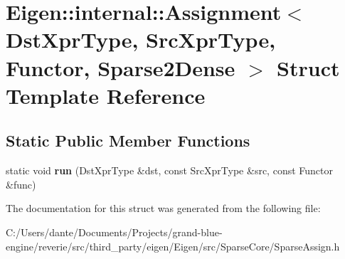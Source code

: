 \hypertarget{struct_eigen_1_1internal_1_1_assignment_3_01_dst_xpr_type_00_01_src_xpr_type_00_01_functor_00_01_sparse2_dense_01_4}{}\section{Eigen\+::internal\+::Assignment$<$ Dst\+Xpr\+Type, Src\+Xpr\+Type, Functor, Sparse2\+Dense $>$ Struct Template Reference}
\label{struct_eigen_1_1internal_1_1_assignment_3_01_dst_xpr_type_00_01_src_xpr_type_00_01_functor_00_01_sparse2_dense_01_4}
\subsection*{Static Public Member Functions}
\begin{DoxyCompactItemize}
\item 
\mbox{\label{struct_eigen_1_1internal_1_1_assignment_3_01_dst_xpr_type_00_01_src_xpr_type_00_01_functor_00_01_sparse2_dense_01_4_ab9b166c76885ff13090942424e88db79}} 
static void {\bfseries run} (Dst\+Xpr\+Type \&dst, const Src\+Xpr\+Type \&src, const Functor \&func)
\end{DoxyCompactItemize}


The documentation for this struct was generated from the following file\+:\begin{DoxyCompactItemize}
\item 
C\+:/\+Users/dante/\+Documents/\+Projects/grand-\/blue-\/engine/reverie/src/third\+\_\+party/eigen/\+Eigen/src/\+Sparse\+Core/Sparse\+Assign.\+h\end{DoxyCompactItemize}
